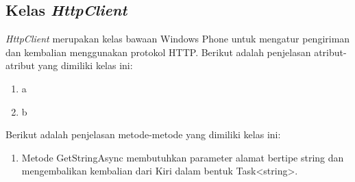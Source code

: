 \subsection{Kelas \textit{HttpClient}}
\label{lab:Kelas HttpClient}
\hspace{0.5cm} \textit{HttpClient} merupakan kelas bawaan Windows Phone untuk mengatur pengiriman dan kembalian menggunakan protokol HTTP. Berikut adalah penjelasan atribut-atribut yang dimiliki kelas ini:
\begin{enumerate}
	\item a
	\item b
\end{enumerate}

Berikut adalah penjelasan metode-metode yang dimiliki kelas ini:
\begin{enumerate}
	\item Metode GetStringAsync membutuhkan parameter alamat bertipe string dan mengembalikan kembalian dari Kiri dalam bentuk Task<string>.
\end{enumerate}

